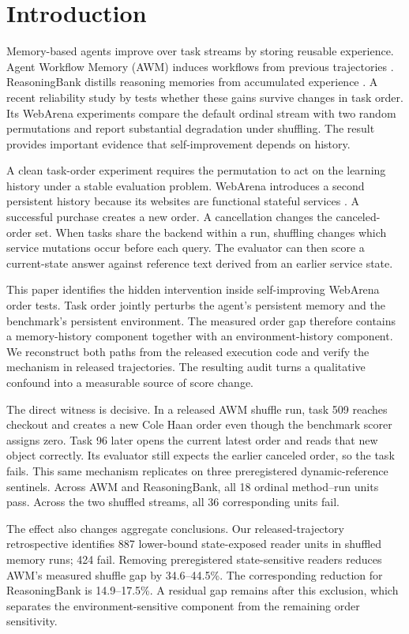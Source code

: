 \section{Introduction}
Memory-based agents improve over task streams by storing reusable experience. Agent Workflow Memory (AWM) induces workflows from previous trajectories \citep{wang2024awm}. ReasoningBank distills reasoning memories from accumulated experience \citep{ouyang2026reasoningbank}. A recent reliability study by \citet{ye2026fragility} tests whether these gains survive changes in task order. Its WebArena experiments compare the default ordinal stream with two random permutations and report substantial degradation under shuffling. The result provides important evidence that self-improvement depends on history.

A clean task-order experiment requires the permutation to act on the learning history under a stable evaluation problem. WebArena introduces a second persistent history because its websites are functional stateful services \citep{zhou2024webarena}. A successful purchase creates a new order. A cancellation changes the canceled-order set. When tasks share the backend within a run, shuffling changes which service mutations occur before each query. The evaluator can then score a current-state answer against reference text derived from an earlier service state.

This paper identifies the hidden intervention inside self-improving WebArena order tests. Task order jointly perturbs the agent's persistent memory and the benchmark's persistent environment. The measured order gap therefore contains a memory-history component together with an environment-history component. We reconstruct both paths from the released execution code and verify the mechanism in released trajectories. The resulting audit turns a qualitative confound into a measurable source of score change.

The direct witness is decisive. In a released AWM shuffle run, task 509 reaches checkout and creates a new Cole Haan order even though the benchmark scorer assigns zero. Task 96 later opens the current latest order and reads that new object correctly. Its evaluator still expects the earlier canceled order, so the task fails. This same mechanism replicates on three preregistered dynamic-reference sentinels. Across AWM and ReasoningBank, all 18 ordinal method--run units pass. Across the two shuffled streams, all 36 corresponding units fail.

The effect also changes aggregate conclusions. Our released-trajectory retrospective identifies 887 lower-bound state-exposed reader units in shuffled memory runs; 424 fail. Removing preregistered state-sensitive readers reduces AWM's measured shuffle gap by 34.6--44.5\%. The corresponding reduction for ReasoningBank is 14.9--17.5\%. A residual gap remains after this exclusion, which separates the environment-sensitive component from the remaining order sensitivity.

